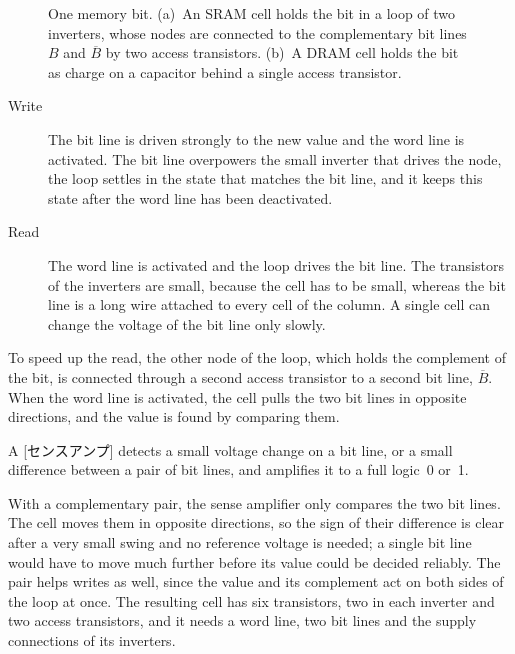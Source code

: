 \documentclass[../main.tex]{subfiles}
\begin{document}
\begin{figure}[htbp]
  \centering
  
  \caption{One memory bit.  (a)~An SRAM cell holds the bit in a loop of two
    inverters, whose nodes are connected to the complementary bit lines $B$
    and $\overline{B}$ by two access transistors.  (b)~A DRAM cell holds the
    bit as charge on a capacitor behind a single access transistor.}
  \label{fig:l15-cells}
\end{figure}

\begin{description}
  \item[Write] The bit line is driven strongly to the new value and the word
    line is activated.  The bit line overpowers the small inverter that drives
    the node, the loop settles in the state that matches the bit line, and it
    keeps this state after the word line has been deactivated.
  \item[Read] The word line is activated and the loop drives the bit line.
    The transistors of the inverters are small, because the cell has to be
    small, whereas the bit line is a long wire attached to every cell of the
    column.  A single cell can change the voltage of the bit line only slowly.
\end{description}

To speed up the read, the other node of the loop, which holds the complement
of the bit, is connected through a second access transistor to a second bit
line, $\overline{B}$.  When the word line is activated, the cell pulls the two
bit lines in opposite directions, and the value is found by comparing them.

\begin{definition}
  A [センスアンプ] detects a small voltage change on a
  bit line, or a small difference between a pair of bit lines, and amplifies
  it to a full logic~0 or~1.
\end{definition}

With a complementary pair, the sense amplifier only compares the two bit
lines.  The cell moves them in opposite directions, so the sign of their
difference is clear after a very small swing and no reference voltage is
needed; a single bit line would have to move much further before its value
could be decided reliably.  The pair helps writes as well,
since the value and its complement act on both sides of the loop at once.  The
resulting cell has six transistors, two in each inverter and two access
transistors, and it needs a word line, two bit lines and the supply
connections of its inverters.
\end{document}
